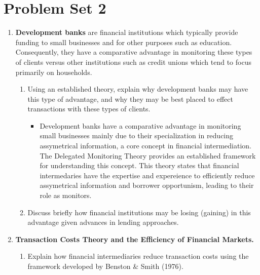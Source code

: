 \newpage

\section{Problem Set 2}

\begin{enumerate}

    \item \textbf{Development banks} are financial institutions which typically provide funding
    to small businesses and for other purposes such as education. Consequently,
    they have a comparative advantage in monitoring these types of clients versus
    other institutions such as credit unions which tend to focus primarily on
    households. 
    
    \begin{enumerate}
        \item Using an established theory, explain why development banks may
        have this type of advantage, and why they may be best placed to effect
        transactions with these types of clients.

        \begin{itemize}
            \item Development banks have a comparative advantage in monitoring small businesses mainly due 
                  to their specialization in reducing assymetrical information, a core concept in financial intermediation. The Delegated Monitoring Theory 
                  provides an established framework for understanding this concept. This theory states that financial intermedaries have the expertise and expereience 
                  to efficiently reduce assymetrical information and borrower opportunism, leading to their role as monitors.  
        \end{itemize}
        
        \item Discuss briefly how financial institutions may be losing (gaining) in this advantage 
        given advances in lending approaches.
    \end{enumerate}

    \item \textbf{Transaction Costs Theory and the Efficiency of Financial Markets.} 
    
    \begin{enumerate}
        \item Explain how financial intermediaries reduce transaction costs using the framework
        developed by Benston \& Smith (1976).


\end{enumerate}
\end{enumerate}
